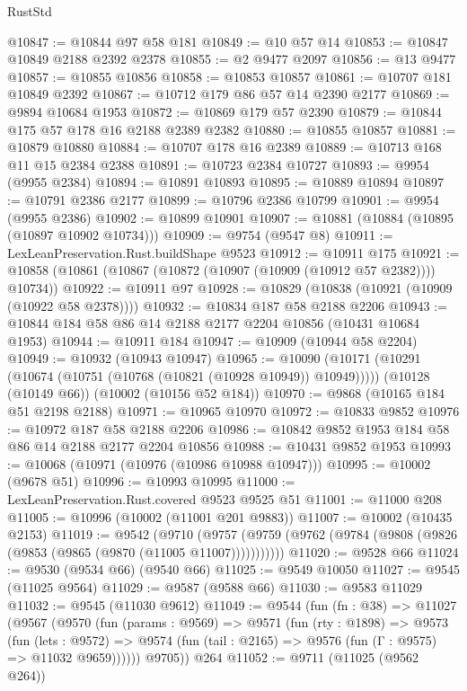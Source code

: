 \begin{lexlean}{RustStd}
\begin{coremodule}
@10847 := @10844 @97 @58 @181
@10849 := @10 @57 @14
@10853 := @10847 @10849 @2188 @2392 @2378
@10855 := @2 @9477 @2097
@10856 := @13 @9477
@10857 := @10855 @10856
@10858 := @10853 @10857
@10861 := @10707 @181 @10849 @2392
@10867 := @10712 @179 @86 @57 @14 @2390 @2177
@10869 := @9894 @10684 @1953
@10872 := @10869 @179 @57 @2390
@10879 := @10844 @175 @57 @178 @16 @2188 @2389 @2382
@10880 := @10855 @10857
@10881 := @10879 @10880
@10884 := @10707 @178 @16 @2389
@10889 := @10713 @168 @11 @15 @2384 @2388
@10891 := @10723 @2384 @10727
@10893 := @9954 (@9955 @2384)
@10894 := @10891 @10893
@10895 := @10889 @10894
@10897 := @10791 @2386 @2177
@10899 := @10796 @2386 @10799
@10901 := @9954 (@9955 @2386)
@10902 := @10899 @10901
@10907 := @10881 (@10884 (@10895 (@10897 @10902 @10734)))
@10909 := @9754 (@9547 @8)
@10911 := LexLeanPreservation.Rust.buildShape @9523
@10912 := @10911 @175
@10921 := @10858 (@10861 (@10867 (@10872 (@10907 (@10909 (@10912 @57 @2382)))) @10734))
@10922 := @10911 @97
@10928 := @10829 (@10838 (@10921 (@10909 (@10922 @58 @2378))))
@10932 := @10834 @187 @58 @2188 @2206
@10943 := @10844 @184 @58 @86 @14 @2188 @2177 @2204 @10856 (@10431 @10684 @1953)
@10944 := @10911 @184
@10947 := @10909 (@10944 @58 @2204)
@10949 := @10932 (@10943 @10947)
@10965 := @10090
    (@10171 (@10291 (@10674 (@10751 (@10768 (@10821 (@10928 @10949)) @10949)))))
    (@10128 (@10149 @66))
    (@10002 (@10156 @52 @184))
@10970 := @9868 (@10165 @184 @51 @2198 @2188)
@10971 := @10965 @10970
@10972 := @10833 @9852
@10976 := @10972 @187 @58 @2188 @2206
@10986 := @10842 @9852 @1953 @184 @58 @86 @14 @2188 @2177 @2204 @10856
@10988 := @10431 @9852 @1953
@10993 := @10068 (@10971 (@10976 (@10986 @10988 @10947)))
@10995 := @10002 (@9678 @51)
@10996 := @10993 @10995
@11000 := LexLeanPreservation.Rust.covered @9523 @9525 @51
@11001 := @11000 @208
@11005 := @10996 (@10002 (@11001 @201 @9883))
@11007 := @10002 (@10435 @2153)
@11019 := @9542
    (@9710 (@9757 (@9759 (@9762 (@9784 (@9808 (@9826 (@9853 (@9865 (@9870 (@11005 @11007)))))))))))
@11020 := @9528 @66
@11024 := @9530 (@9534 @66) (@9540 @66)
@11025 := @9549 @10050
@11027 := @9545 (@11025 @9564)
@11029 := @9587 (@9588 @66)
@11030 := @9583 @11029
@11032 := @9545 (@11030 @9612)
@11049 := @9544
    (fun (fn : @38) =>
    @11027
      (@9567
        (@9570
          (fun (params : @9569) =>
          @9571
            (fun (rty : @1898) =>
            @9573
              (fun (lets : @9572) =>
              @9574 (fun (tail : @2165) => @9576 (fun (Γ : @9575) => @11032 @9659))))))
        @9705))
    @264
@11052 := @9711 (@11025 (@9562 @264))

\end{coremodule}
\end{lexlean}
